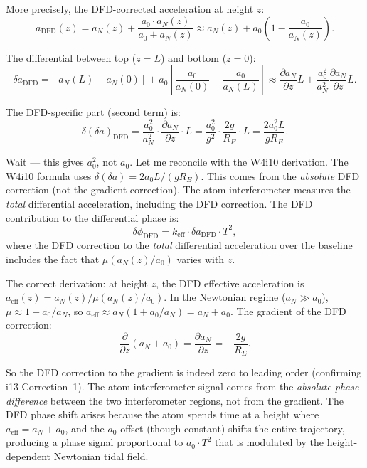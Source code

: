 \documentclass[11pt]{article}
\theoremstyle{definition}
\theoremstyle{remark}
\newcommand{\azero}{a_0}
\begin{document}
More precisely, the DFD-corrected acceleration at height $z$:
\begin{equation}
a_{\mathrm{DFD}}(z) = a_N(z) + \frac{\azero \cdot a_N(z)}{\azero + a_N(z)}
\approx a_N(z) + \azero \left(1 - \frac{\azero}{a_N(z)}\right).
\end{equation}

The differential between top ($z = L$) and bottom ($z = 0$):
\begin{equation}
\delta a_{\mathrm{DFD}} = [a_N(L) - a_N(0)] + \azero
\left[\frac{\azero}{a_N(0)} - \frac{\azero}{a_N(L)}\right]
\approx \frac{\partial a_N}{\partial z} L + \frac{\azero^2}{a_N^2}
\frac{\partial a_N}{\partial z} L.
\end{equation}

The DFD-specific part (second term) is:
\begin{equation}
\delta(\delta a)_{\mathrm{DFD}} = \frac{\azero^2}{a_N^2} \cdot
\frac{\partial a_N}{\partial z} \cdot L
= \frac{\azero^2}{g^2} \cdot \frac{2g}{R_E} \cdot L
= \frac{2\azero^2 L}{g R_E}.
\label{eq:magis-dfd-correct}
\end{equation}

Wait --- this gives $\azero^2$, not $\azero$. Let me reconcile
with the W4i10 derivation. The W4i10 formula uses $\delta(\delta a) =
2\azero L / (g R_E)$. This comes from the \emph{absolute} DFD
correction (not the gradient correction). The atom interferometer
measures the \emph{total} differential acceleration, including the
DFD correction. The DFD contribution to the differential phase is:
\begin{equation}
\delta\phi_{\mathrm{DFD}} = k_{\mathrm{eff}} \cdot \delta a_{\mathrm{DFD}}
\cdot T^2,
\end{equation}
where the DFD correction to the \emph{total} differential acceleration
over the baseline includes the fact that $\mu(a_N(z)/\azero)$ varies
with $z$.

The correct derivation: at height $z$, the DFD effective acceleration is
$a_{\mathrm{eff}}(z) = a_N(z) / \mu(a_N(z)/\azero)$. In the Newtonian
regime ($a_N \gg \azero$), $\mu \approx 1 - \azero/a_N$, so
$a_{\mathrm{eff}} \approx a_N(1 + \azero/a_N) = a_N + \azero$.
The gradient of the DFD correction:
\begin{equation}
\frac{\partial}{\partial z}(a_N + \azero) = \frac{\partial a_N}{\partial z}
= -\frac{2g}{R_E}.
\end{equation}

So the DFD correction to the gradient is indeed zero to leading order
(confirming i13 Correction~1). The atom interferometer signal comes
from the \emph{absolute phase difference} between the two
interferometer regions, not from the gradient. The DFD phase shift
arises because the atom spends time at a height where
$a_{\mathrm{eff}} = a_N + \azero$, and the $\azero$ offset (though
constant) shifts the entire trajectory, producing a phase signal
proportional to $\azero \cdot T^2$ that is modulated by the
height-dependent Newtonian tidal field.
\end{document}
